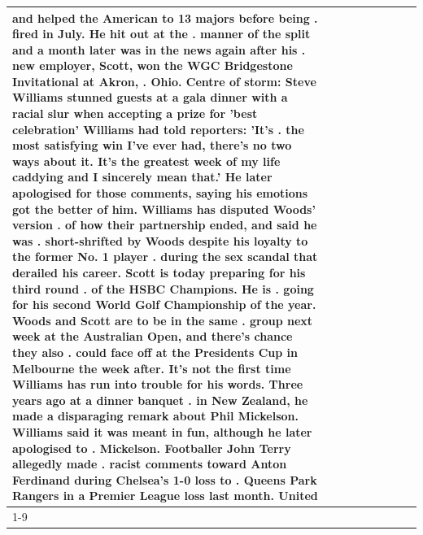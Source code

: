 \begin{table}[H]
\begin{tabular}{lllrlllll}
and helped the American to 13 majors before being . fired in July. He hit out at the . manner of the split and a month later was in the news again after his . new employer, Scott, won the WGC Bridgestone Invitational at Akron, . Ohio. Centre of storm: Steve Williams stunned guests at a gala dinner with a racial slur when accepting a prize for 'best celebration' Williams had told reporters: 'It's . the most satisfying win I've ever had, there's no two ways about it. It's the greatest week of my life caddying and I sincerely mean that.' He later apologised for those comments, saying his emotions got the better of him. Williams has disputed Woods' version . of how their partnership ended, and said he was . short-shrifted by Woods despite his loyalty to the former No. 1 player . during the sex scandal that derailed his career. Scott is today preparing for his third round . of the HSBC Champions. He is . going for his second World Golf Championship of the year. Woods and Scott are to be in the same . group next week at the Australian Open, and there's chance they also . could face off at the Presidents Cup in Melbourne the week after. It's not the first time Williams has run into trouble for his words. Three years ago at a dinner banquet . in New Zealand, he made a disparaging remark about Phil Mickelson. Williams said it was meant in fun, although he later apologised to . Mickelson. Footballer John Terry allegedly made . racist comments toward Anton Ferdinand during Chelsea's 1-0 loss to . Queens Park Rangers in a Premier League loss last month. United \\
\cline{1-9}

\end{tabular}
\end{table}
